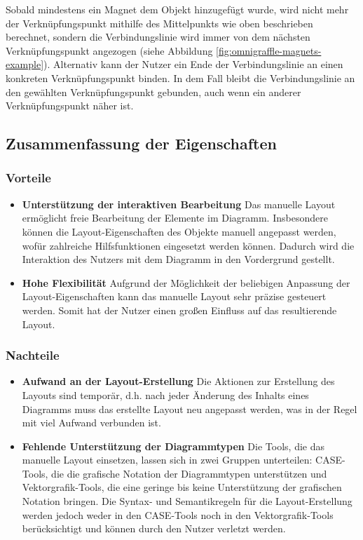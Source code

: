 Sobald mindestens ein Magnet dem Objekt hinzugefügt wurde, wird nicht mehr der Verknüpfungspunkt mithilfe des Mittelpunkts wie oben beschrieben berechnet, sondern die Verbindungslinie wird immer von dem nächsten Verknüpfungspunkt angezogen (siehe Abbildung \ref{fig:omnigraffle-magnets-example}). Alternativ kann der Nutzer ein Ende der Verbindungslinie an einen konkreten Verknüpfungspunkt binden. In dem Fall bleibt die Verbindungslinie an den gewählten Verknüpfungspunkt gebunden, auch wenn ein anderer Verknüpfungspunkt näher ist.

\subsection{Zusammenfassung der Eigenschaften}
\label{subsec:summary-manual-layout}

\subsubsection{Vorteile}

\begin{itemize}

\item
\textbf{Unterstützung der interaktiven Bearbeitung}
Das manuelle Layout ermöglicht freie Bearbeitung der Elemente im Diagramm. Insbesondere können die Layout-Eigenschaften des Objekte manuell angepasst werden, wofür zahlreiche Hilfsfunktionen eingesetzt werden können. Dadurch wird die Interaktion des Nutzers mit dem Diagramm in den Vordergrund gestellt.

\item
\textbf{Hohe Flexibilität}
Aufgrund der Möglichkeit der beliebigen Anpassung der Layout-Ei\-gen\-schaften kann das manuelle Layout sehr präzise gesteuert werden. Somit hat der Nutzer einen großen Einfluss auf das resultierende Layout.

\end{itemize}

\subsubsection{Nachteile}

\begin{itemize}

\item
\textbf{Aufwand an der Layout-Erstellung}
Die Aktionen zur Erstellung des Layouts sind temporär, d.h. nach jeder Änderung des Inhalts eines Diagramms muss das erstellte Layout neu angepasst werden, was in der Regel mit viel Aufwand verbunden ist.

\item
\textbf{Fehlende Unterstützung der Diagrammtypen}
Die Tools, die das manuelle Layout einsetzen, lassen sich in zwei Gruppen unterteilen: CASE-Tools, die die grafische Notation der Diagrammtypen unterstützen und Vektorgrafik-Tools, die eine geringe bis keine Unterstützung der grafischen Notation bringen. Die Syntax- und Semantikregeln für die Layout-Erstellung werden jedoch weder in den CASE-Tools noch in den Vektorgrafik-Tools berücksichtigt und können durch den Nutzer verletzt werden.

\end{itemize}

